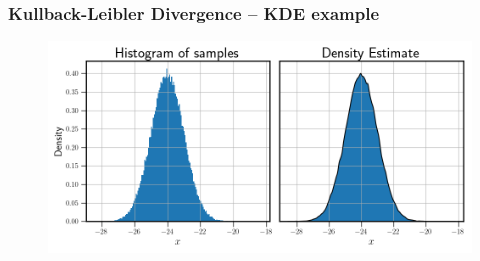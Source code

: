 \documentclass[11pt,aspectratio=169]{beamer}
\begin{document}
    \begin{frame}
        \frametitle{Kullback-Leibler Divergence -- KDE example}
        \begin{figure}
            \centering
            \includegraphics[width=\textwidth]{../Figures/kde_example.png}
        \end{figure}
    \end{frame}
\end{document}
